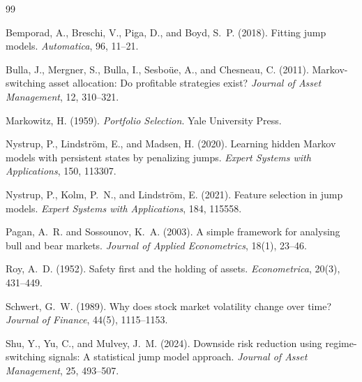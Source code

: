\documentclass[11pt]{article}
\begin{document}
\begin{thebibliography}{99}

Bemporad, A., Breschi, V., Piga, D., and Boyd, S.~P. (2018).
Fitting jump models.
\emph{Automatica}, 96, 11--21.

Bulla, J., Mergner, S., Bulla, I., Sesbo\"ue, A., and Chesneau, C. (2011).
Markov-switching asset allocation: Do profitable strategies exist?
\emph{Journal of Asset Management}, 12, 310--321.

Markowitz, H. (1959).
\emph{Portfolio Selection}.
Yale University Press.

Nystrup, P., Lindstr\"om, E., and Madsen, H. (2020).
Learning hidden Markov models with persistent states by penalizing jumps.
\emph{Expert Systems with Applications}, 150, 113307.

Nystrup, P., Kolm, P.~N., and Lindstr\"om, E. (2021).
Feature selection in jump models.
\emph{Expert Systems with Applications}, 184, 115558.

Pagan, A.~R. and Sossounov, K.~A. (2003).
A simple framework for analysing bull and bear markets.
\emph{Journal of Applied Econometrics}, 18(1), 23--46.

Roy, A.~D. (1952).
Safety first and the holding of assets.
\emph{Econometrica}, 20(3), 431--449.

Schwert, G.~W. (1989).
Why does stock market volatility change over time?
\emph{Journal of Finance}, 44(5), 1115--1153.

Shu, Y., Yu, C., and Mulvey, J.~M. (2024).
Downside risk reduction using regime-switching signals: A statistical jump model approach.
\emph{Journal of Asset Management}, 25, 493--507.

\end{thebibliography}
\end{document}
